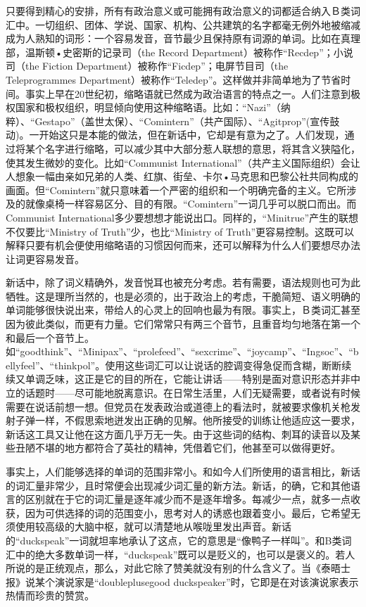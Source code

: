 只要得到精心的安排，所有有政治意义或可能拥有政治意义的词都适合纳入Ｂ类词汇中。一切组织、团体、学说、国家、机构、公共建筑的名字都毫无例外地被缩减成为人熟知的词形：一个容易发音，音节最少且保持原有词源的单词。比如在真理部，温斯顿•史密斯的记录司（the
Record Department）被称作``Recdep''；小说司（the Fiction
Department）被称作``Ficdep''；电屏节目司（the Teleprogrammes
Department）被称作``Teledep''。这样做并非简单地为了节省时间。事实上早在20世纪初，缩略语就已然成为政治语言的特点之一。人们注意到极权国家和极权组织，明显倾向使用这种缩略语。比如：``Nazi''（纳粹）、``Gestapo''（盖世太保）、``Comintern''（共产国际）、``Agitprop''(宣传鼓动)。一开始这只是本能的做法，但在新话中，它却是有意为之了。人们发现，通过将某个名字进行缩略，可以减少其中大部分惹人联想的意思，将其含义狭隘化，使其发生微妙的变化。比如``Communist
International''（共产主义国际组织）会让人想象一幅由亲如兄弟的人类、红旗、街垒、卡尔•马克思和巴黎公社共同构成的画面。但``Comintern''就只意味着一个严密的组织和一个明确完备的主义。它所涉及的就像桌椅一样容易区分、目的有限。``Comintern''一词几乎可以脱口而出。而Communist
International多少要想想才能说出口。同样的，``Minitrue''产生的联想不仅要比``Ministry
of Truth''少，也比``Ministry of
Truth''更容易控制。这既可以解释只要有机会便使用缩略语的习惯因何而来，还可以解释为什么人们要想尽办法让词更容易发音。

新话中，除了词义精确外，发音悦耳也被充分考虑。若有需要，语法规则也可为此牺牲。这是理所当然的，也是必须的，出于政治上的考虑，干脆简短、语义明确的单词能够很快说出来，带给人的心灵上的回响也最为有限。事实上，Ｂ类词汇甚至因为彼此类似，而更有力量。它们常常只有两三个音节，且重音均匀地落在第一个和最后一个音节上。如``goodthink''、``Minipax''、``prolefeed''、``sexcrime''、``joycamp''、``Ingsoc''、``bellyfeel''、``thinkpol''。使用这些词汇可以让说话的腔调变得急促而含糊，断断续续又单调乏味，这正是它的目的所在，它能让讲话——特别是面对意识形态并非中立的话题时——尽可能地脱离意识。在日常生活里，人们无疑需要，或者说有时候需要在说话前想一想。但党员在发表政治或道德上的看法时，就被要求像机关枪发射子弹一样，不假思索地迸发出正确的见解。他所接受的训练让他适应这一要求，新话这工具又让他在这方面几乎万无一失。由于这些词的结构、刺耳的读音以及某些丑陋不堪的地方都符合了英社的精神，凭借着它们，他甚至可以做得更好。

事实上，人们能够选择的单词的范围非常小。和如今人们所使用的语言相比，新话的词汇量非常少，且时常便会出现减少词汇量的新方法。新话，的确，它和其他语言的区别就在于它的词汇量是逐年减少而不是逐年增多。每减少一点，就多一点收获，因为可供选择的词的范围变小，思考对人的诱惑也跟着变小。最后，它希望无须使用较高级的大脑中枢，就可以清楚地从喉咙里发出声音。新话的``duckspeak''一词就坦率地承认了这点，它的意思是``像鸭子一样叫''。和B类词汇中的绝大多数单词一样，``duckspeak''既可以是贬义的，也可以是褒义的。若人所说的是正统观点，那么，对此它除了赞美就没有别的什么含义了。当《泰晤士报》说某个演说家是``doubleplusegood
duckspeaker''时，它即是在对该演说家表示热情而珍贵的赞赏。

